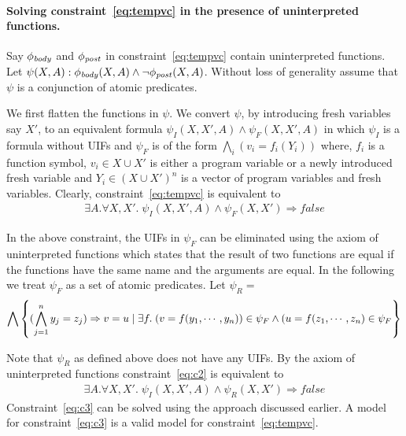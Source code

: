 \documentclass[a4paper,10pt]{article}
\begin{document}
\paragraph{Solving constraint~\ref{eq:tempvc} in the presence of uninterpreted functions.}

Say $\mathit{\phi_{body}}$ and $\mathit{\phi_{post}}$ in constraint~\ref{eq:tempvc} contain uninterpreted functions.
Let $\psi(X,A): \mathit{\phi_{body}}(X,A) \wedge \neg \mathit{\phi_{post}}(X,A)$.
Without loss of generality assume that $\psi$ is a conjunction of atomic predicates.

We first flatten the functions in $\psi$. 
We convert $\psi$, by introducing fresh variables say $X'$, to an equivalent formula $\psi_{I}(X,X',A) \wedge \psi_{F}(X,X',A)$ in which
$\psi_I$ is a formula without UIFs and 
$\psi_{F}$ is of the form $\bigwedge_i (v_i = f_i(Y_i))$ where, $f_i$ is a function symbol,  
$v_i \in X \cup X'$ is either a program variable or a newly introduced fresh variable 
and $Y_i \in (X \cup X')^n$ is a vector of program variables and fresh variables.  
Clearly, constraint~\ref{eq:tempvc} is equivalent to 
%
\begin{align}
\exists A. \forall X,X'. \; \psi_{I}(X,X',A) \wedge \psi_{F}(X,X') \Rightarrow false \label{eq:c2}
\end{align}

In the above constraint, the UIFs in $\psi_{F}$ can be eliminated using the axiom of uninterpreted functions which states that the result of  two functions are equal if the functions have the same name and the arguments are equal. In the following we treat $\psi_F$ as a set of atomic predicates.
Let $\psi_R =$
%
\begin{align}
\bigwedge \left\lbrace (\bigwedge \limits_{j=1}^{n} y_j = z_j) \Rightarrow v = u \; | \; \exists f. \; (v = f(y_1,\cdots,y_n)) \in \psi_F \wedge (u = f(z_1,\cdots,z_n) \in \psi_F \right\rbrace  
\end{align}

Note that $\psi_R$ as defined above does not have any UIFs. By the axiom of uninterpreted functions constraint~\ref{eq:c2} is equivalent to 
%
\begin{align}
\exists A. \forall X,X'. \; \psi_{I}(X,X',A) \wedge \psi_{R}(X,X')  \Rightarrow false \label{eq:c3}
\end{align}
%
Constraint~\ref{eq:c3} can be solved using the approach discussed earlier. A model for constraint~\ref{eq:c3} is a valid model for constraint~\ref{eq:tempvc}.
\end{document}
